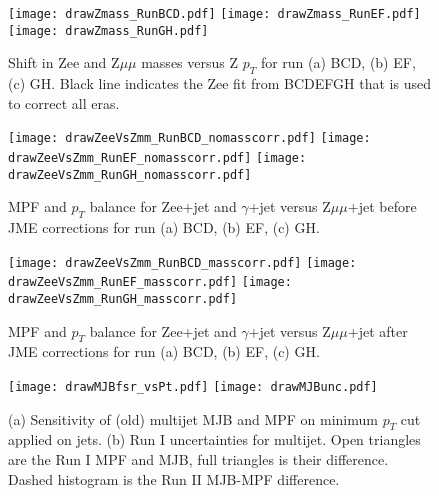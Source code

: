 \documentclass[landscape,10pt]{beamer} %
\begin{document}
\newpage

\begin{figure}[p]
  \centering
  \texttt{[image: drawZmass\_RunBCD.pdf]}
  \texttt{[image: drawZmass\_RunEF.pdf]}
  \texttt{[image: drawZmass\_RunGH.pdf]}
\caption{
Shift in Zee and Z$\mu\mu$ masses versus Z $p_T$ for run (a) BCD, (b) EF, (c) GH. Black line indicates the Zee fit from BCDEFGH that is used to correct all eras.
}
\end{figure}

\begin{figure}[p]
\centering
  \texttt{[image: drawZeeVsZmm\_RunBCD\_nomasscorr.pdf]}
  \texttt{[image: drawZeeVsZmm\_RunEF\_nomasscorr.pdf]}
  \texttt{[image: drawZeeVsZmm\_RunGH\_nomasscorr.pdf]}
\caption{
MPF and $p_T$ balance for Zee+jet and $\gamma$+jet versus Z$\mu\mu$+jet before JME corrections for run (a) BCD, (b) EF, (c) GH. 
}
\end{figure}

\newpage

\begin{figure}[p]
\centering
 \texttt{[image: drawZeeVsZmm\_RunBCD\_masscorr.pdf]}
 \texttt{[image: drawZeeVsZmm\_RunEF\_masscorr.pdf]}
  \texttt{[image: drawZeeVsZmm\_RunGH\_masscorr.pdf]}
\caption{
MPF and $p_T$ balance for Zee+jet and $\gamma$+jet versus Z$\mu\mu$+jet after JME corrections for run (a) BCD, (b) EF, (c) GH. 
}
\end{figure}

\newpage

\begin{figure}[p]
\centering
\texttt{[image: drawMJBfsr\_vsPt.pdf]}
\texttt{[image: drawMJBunc.pdf]}
\caption{
(a) Sensitivity of (old) multijet MJB and MPF on minimum $p_T$ cut applied on jets.
(b) Run I uncertainties for multijet. Open triangles are the Run I MPF and MJB, full triangles is their difference. Dashed histogram is the Run II MJB-MPF difference.}
\end{figure}
\end{document}
